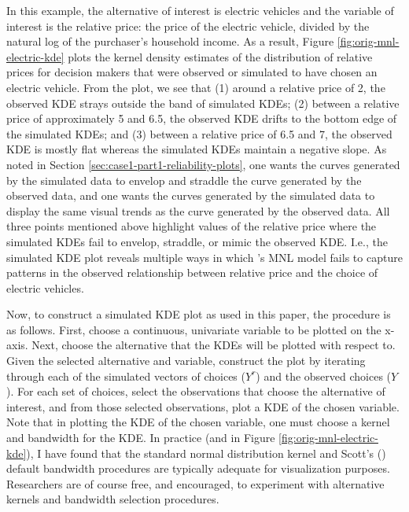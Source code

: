 \documentclass[preprint]{elsarticle}
\begin{document}
In this example, the alternative of interest is electric vehicles and the variable of interest is the relative price: the price of the electric vehicle, divided by the natural log of the purchaser's household income. As a result, Figure \ref{fig:orig-mnl-electric-kde} plots the kernel density estimates of the distribution of relative prices for decision makers that were observed or simulated to have chosen an electric vehicle. From the plot, we see that (1) around a relative price of 2, the observed KDE strays outside the band of simulated KDEs; (2) between a relative price of approximately 5 and 6.5, the observed KDE drifts to the bottom edge of the simulated KDEs; and (3) between a relative price of 6.5 and 7, the observed KDE is mostly flat whereas the simulated KDEs maintain a negative slope. As noted in Section \ref{sec:case1-part1-reliability-plots}, one wants the curves generated by the simulated data to envelop and straddle the curve generated by the observed data, and one wants the curves generated by the simulated data to display the same visual trends as the curve generated by the observed data. All three points mentioned above highlight values of the relative price where the simulated KDEs fail to envelop, straddle, or mimic the observed KDE. I.e., the simulated KDE plot reveals multiple ways in which \citeauthor{brownstone_forecasting_1998}'s MNL model fails to capture patterns in the observed relationship between relative price and the choice of electric vehicles.

Now, to construct a simulated KDE plot as used in this paper, the procedure is as follows. First, choose a continuous, univariate variable to be plotted on the x-axis. Next, choose the alternative that the KDEs will be plotted with respect to. Given the selected alternative and variable, construct the plot by iterating through each of the simulated vectors of choices ($ Y^r$) and the observed choices ($Y$). For each set of choices, select the observations that choose the alternative of interest, and from those selected observations, plot a KDE of the chosen variable. Note that in plotting the KDE of the chosen variable, one must choose a kernel and bandwidth for the KDE. In practice (and in Figure \ref{fig:orig-mnl-electric-kde}), I have found that the standard normal distribution kernel and Scott's (\citeyear{scott_multivariate_1992}) default bandwidth procedures are typically adequate for visualization purposes. Researchers are of course free, and encouraged, to experiment with alternative kernels and bandwidth selection procedures.
\end{document}
